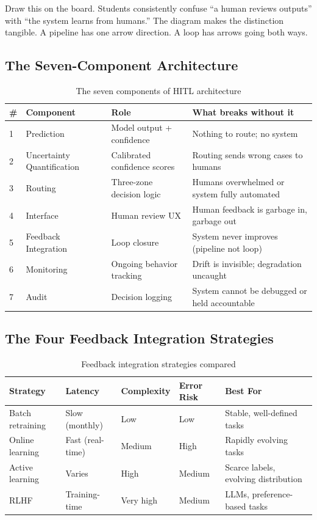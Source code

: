 \begin{technote}
Draw this on the board. Students consistently confuse ``a human reviews outputs'' with ``the system learns from humans.'' The diagram makes the distinction tangible. A pipeline has one arrow direction. A loop has arrows going both ways.
\end{technote}

\subsection{The Seven-Component Architecture}

\begin{table}[htbp]
\caption{The seven components of HITL architecture}
\label{tab:seven-components}
\centering
\begin{tabular}{@{}p{0.5cm}p{3cm}p{4cm}p{4cm}@{}}
\toprule
\textbf{\#} & \textbf{Component} & \textbf{Role} & \textbf{What breaks without it} \\
\midrule
1 & Prediction & Model output + confidence & Nothing to route; no system \\
2 & Uncertainty Quantification & Calibrated confidence scores & Routing sends wrong cases to humans \\
3 & Routing & Three-zone decision logic & Humans overwhelmed or system fully automated \\
4 & Interface & Human review UX & Human feedback is garbage in, garbage out \\
5 & Feedback Integration & Loop closure & System never improves (pipeline not loop) \\
6 & Monitoring & Ongoing behavior tracking & Drift is invisible; degradation uncaught \\
7 & Audit & Decision logging & System cannot be debugged or held accountable \\
\bottomrule
\end{tabular}
\end{table}

\subsection{The Four Feedback Integration Strategies}

\begin{table}[htbp]
\caption{Feedback integration strategies compared}
\label{tab:feedback-strategies}
\centering
\begin{tabular}{@{}p{2.5cm}p{2cm}p{2cm}p{2cm}p{3cm}@{}}
\toprule
\textbf{Strategy} & \textbf{Latency} & \textbf{Complexity} & \textbf{Error Risk} & \textbf{Best For} \\
\midrule
Batch retraining & Slow (monthly) & Low & Low & Stable, well-defined tasks \\
Online learning & Fast (real-time) & Medium & High & Rapidly evolving tasks \\
Active learning & Varies & High & Medium & Scarce labels, evolving distribution \\
RLHF & Training-time & Very high & Medium & LLMs, preference-based tasks \\
\bottomrule
\end{tabular}
\end{table}

